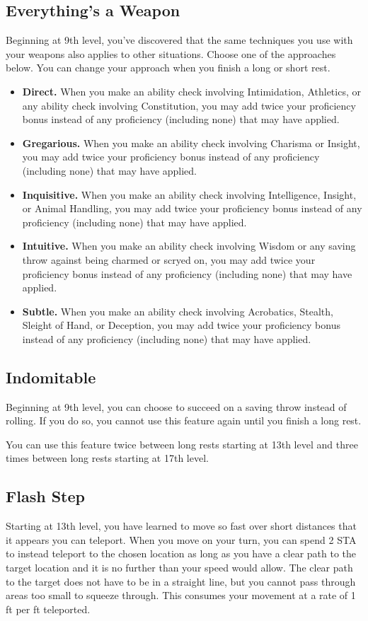 \subsection{Everything's a Weapon}
Beginning at 9th level, you've discovered that the same techniques you use with your weapons also applies to other situations. Choose one of the approaches below. You can change your approach when you finish a long or short rest.

\begin{itemize}
	\item \textbf{Direct.} When you make an ability check involving Intimidation, Athletics, or any ability check involving Constitution, you may add twice your proficiency bonus instead of any proficiency (including none) that may have applied.
	\item \textbf{Gregarious.} When you make an ability check involving Charisma or Insight, you may add twice your proficiency bonus instead of any proficiency (including none) that may have applied.
	\item \textbf{Inquisitive.} When you make an ability check involving Intelligence, Insight, or Animal Handling, you may add twice your proficiency bonus instead of any proficiency (including none) that may have applied.
	\item \textbf{Intuitive.} When you make an ability check involving Wisdom or any saving throw against being charmed or scryed on, you may add twice your proficiency bonus instead of any proficiency (including none) that may have applied.
	\item \textbf{Subtle.} When you make an ability check involving Acrobatics, Stealth, Sleight of Hand, or Deception, you may add twice your proficiency bonus instead of any proficiency (including none) that may have applied.
\end{itemize}

\subsection{Indomitable}

Beginning at 9th level, you can choose to succeed on a saving throw instead of rolling. If you do so, you cannot use this feature again until you finish a long rest.

You can use this feature twice between long rests starting at 13th level and three times between long rests starting at 17th level.

\subsection{Flash Step}
Starting at 13th level, you have learned to move so fast over short distances that it appears you can teleport. When you move on your turn, you can spend 2 STA to instead teleport to the chosen location as long as you have a clear path to the target location and it is no further than your speed would allow. The clear path to the target does not have to be in a straight line, but you cannot pass through areas too small to squeeze through. This consumes your movement at a rate of 1 ft per ft teleported.

